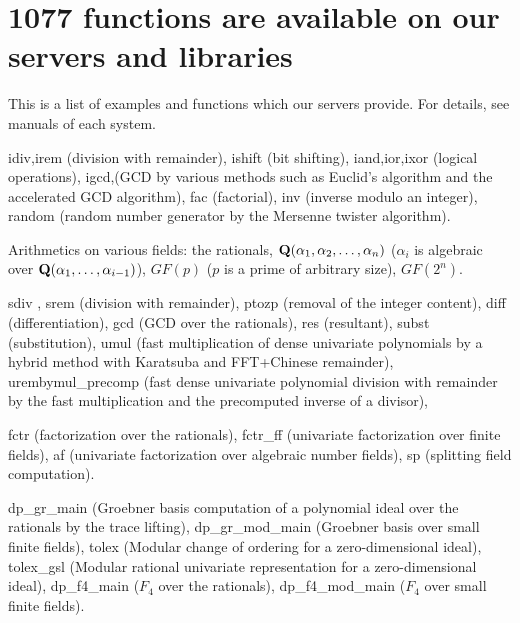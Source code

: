 \section{ 1077 functions are available on our servers and libraries}

This is a list of examples and functions which our
servers provide.
For details, see manuals of each system.

\noindent
{}

\noindent
{idiv},{irem} (division with remainder),
{ishift} (bit shifting),
{iand},{ior},{ixor} (logical operations),
{igcd},(GCD by various methods such as Euclid's algorithm and
the accelerated GCD algorithm),
{fac} (factorial),
{inv} (inverse modulo an integer),
{random} (random number generator by the Mersenne twister algorithm).

\medbreak
\noindent
{}

\noindent
Arithmetics on various fields: the rationals,
${\bf Q}(\alpha_1,\alpha_2,\ldots,\alpha_n)$
($\alpha_i$ is algebraic over ${\bf Q}(\alpha_1,\ldots,\alpha_{i-1})$),
$GF(p)$ ($p$ is a prime of arbitrary size), $GF(2^n)$.

\medbreak
\noindent
{}

\noindent
{sdiv }, {srem } (division with remainder),
{ptozp } (removal of the integer content),
{diff } (differentiation),
{gcd } (GCD over the rationals),
{res } (resultant),
{subst } (substitution),
{umul} (fast multiplication of dense univariate polynomials
by a hybrid method with Karatsuba and FFT+Chinese remainder),
{urembymul\_precomp} (fast dense univariate polynomial
division with remainder by the fast multiplication and
the precomputed inverse of a divisor),

\noindent
{}
{fctr } (factorization over the rationals),
{fctr\_ff } (univariate factorization over finite fields),
{af } (univariate factorization over algebraic number fields),
{sp} (splitting field computation).

\medbreak
\noindent
{}

\noindent
{dp\_gr\_main } (Groebner basis computation of a polynomial ideal
over the rationals by the trace lifting),
{dp\_gr\_mod\_main } (Groebner basis over small finite fields),
{tolex } (Modular change of ordering for a zero-dimensional ideal),
{tolex\_gsl } (Modular rational univariate representation
for a zero-dimensional ideal),
{dp\_f4\_main } ($F_4$ over the rationals),
{dp\_f4\_mod\_main } ($F_4$ over small finite fields).

